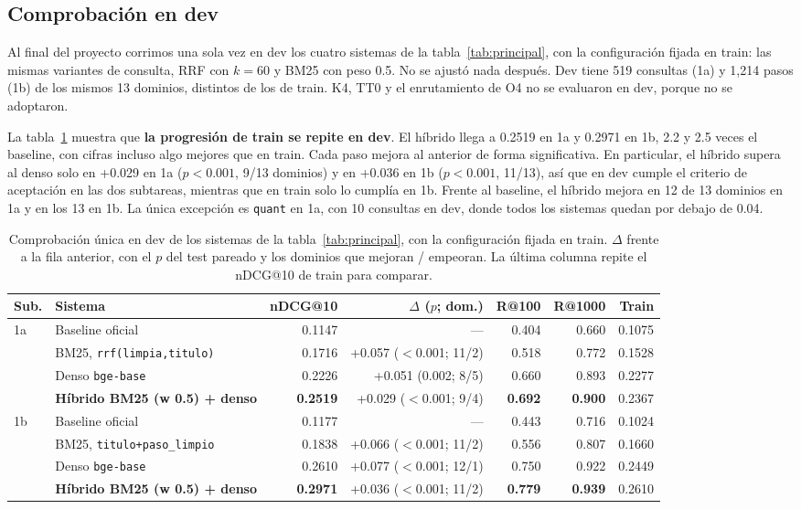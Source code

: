 \documentclass[11pt,a4paper]{article}
\begin{document}
\subsection{Comprobación en dev}
\label{sec:res-dev}

Al final del proyecto corrimos una sola vez en dev los cuatro sistemas de la tabla~\ref{tab:principal}, con la configuración fijada en train: las mismas variantes de consulta, RRF con $k = 60$ y BM25 con peso 0.5. No se ajustó nada después. Dev tiene 519 consultas (1a) y 1,214 pasos (1b) de los mismos 13 dominios, distintos de los de train. K4, TT0 y el enrutamiento de O4 no se evaluaron en dev, porque no se adoptaron.

La tabla~\ref{tab:dev} muestra que \textbf{la progresión de train se repite en dev}. El híbrido llega a 0.2519 en 1a y 0.2971 en 1b, 2.2 y 2.5 veces el baseline, con cifras incluso algo mejores que en train. Cada paso mejora al anterior de forma significativa. En particular, el híbrido supera al denso solo en +0.029 en 1a ($p < 0.001$, 9/13 dominios) y en +0.036 en 1b ($p < 0.001$, 11/13), así que en dev cumple el criterio de aceptación en las dos subtareas, mientras que en train solo lo cumplía en 1b. Frente al baseline, el híbrido mejora en 12 de 13 dominios en 1a y en los 13 en 1b. La única excepción es \texttt{quant} en 1a, con 10 consultas en dev, donde todos los sistemas quedan por debajo de 0.04.

\begin{table}[t]
\centering
\caption{Comprobación única en dev de los sistemas de la tabla~\ref{tab:principal}, con la configuración fijada en train. $\Delta$ frente a la fila anterior, con el $p$ del test pareado y los dominios que mejoran / empeoran. La última columna repite el nDCG@10 de train para comparar.}
\label{tab:dev}
\footnotesize
\setlength{\tabcolsep}{4pt}
\begin{tabular}{llrrrrr}
\toprule
Sub. & Sistema & nDCG@10 & $\Delta$ ($p$; dom.) & R@100 & R@1000 & Train \\
\midrule
1a & Baseline oficial & 0.1147 & --- & 0.404 & 0.660 & 0.1075 \\
   & BM25, \texttt{rrf(limpia,titulo)} & 0.1716 & +0.057 ($<$0.001; 11/2) & 0.518 & 0.772 & 0.1528 \\
   & Denso \texttt{bge-base} & 0.2226 & +0.051 (0.002; 8/5) & 0.660 & 0.893 & 0.2277 \\
   & \textbf{Híbrido BM25 (w 0.5) + denso} & \textbf{0.2519} & +0.029 ($<$0.001; 9/4) & \textbf{0.692} & \textbf{0.900} & 0.2367 \\
\midrule
1b & Baseline oficial & 0.1177 & --- & 0.443 & 0.716 & 0.1024 \\
   & BM25, \texttt{titulo+paso\_limpio} & 0.1838 & +0.066 ($<$0.001; 11/2) & 0.556 & 0.807 & 0.1660 \\
   & Denso \texttt{bge-base} & 0.2610 & +0.077 ($<$0.001; 12/1) & 0.750 & 0.922 & 0.2449 \\
   & \textbf{Híbrido BM25 (w 0.5) + denso} & \textbf{0.2971} & +0.036 ($<$0.001; 11/2) & \textbf{0.779} & \textbf{0.939} & 0.2610 \\
\bottomrule
\end{tabular}
\end{table}
\end{document}
